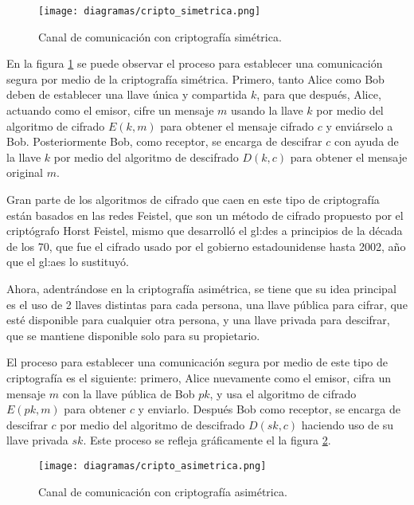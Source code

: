 \begin{figure}[H]
  \begin{center}
    \texttt{[image: diagramas/cripto\_simetrica.png]}
    \caption{Canal de comunicación con criptografía simétrica.}
    \label{cripto_simetrica}
  \end{center}
\end{figure}

En la figura \ref{cripto_simetrica} se puede observar el proceso para
establecer una comunicación segura por medio de la criptografía simétrica.
Primero, tanto Alice como Bob deben de establecer una llave única y
compartida $k$, para que después, Alice, actuando como el emisor, cifre un
mensaje $m$ usando la llave $k$ por medio del algoritmo de cifrado $E(k,m)$
para obtener el mensaje cifrado $c$ y enviárselo a Bob. Posteriormente Bob,
como receptor, se encarga de descifrar $c$ con ayuda de la llave $k$ por
medio del algoritmo de descifrado $D(k,c)$ para obtener el mensaje original
$m$.

Gran parte de los algoritmos de cifrado que caen en este tipo de criptografía
están basados en las redes Feistel, que son un método de cifrado propuesto
por el criptógrafo Horst Feistel, mismo que desarrolló el \gls{gl:des} a
principios de la década de los 70, que fue el cifrado usado por el gobierno
estadounidense hasta 2002, año que el \gls{gl:aes} lo sustituyó.

Ahora, adentrándose en la criptografía asimétrica, se tiene que su idea
principal es el uso de 2 llaves distintas para cada persona, una llave
pública para cifrar, que esté disponible para cualquier otra persona, y una
llave privada para descifrar, que se mantiene disponible solo para su
propietario.

El proceso para establecer una comunicación segura por medio de este tipo
de criptografía es el siguiente: primero, Alice nuevamente como el emisor,
cifra un mensaje $m$ con la llave pública de Bob $pk$, y usa el algoritmo de
cifrado $E(pk,m)$ para obtener $c$ y enviarlo. Después Bob como receptor,
se encarga de descifrar $c$ por medio del algoritmo de descifrado
$D(sk,c)$ haciendo uso de su llave privada $sk$. Este proceso se refleja
gráficamente el la figura \ref{cripto_asimetrica}.

\begin{figure}[H]
  \begin{center}
    \texttt{[image: diagramas/cripto\_asimetrica.png]}
    \caption{Canal de comunicación con criptografía asimétrica.}
    \label{cripto_asimetrica}
  \end{center}
\end{figure}

